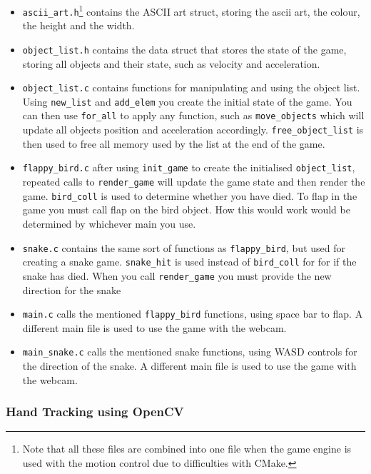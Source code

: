 \documentclass[10pt]{article}
\begin{document}
\begin{itemize}
\item \texttt{ascii\_art.h}\footnote{Note that all these files are combined into one file when the game engine is used with the motion control due to difficulties with CMake.} contains the ASCII art struct, storing the ascii art, the colour, the height and the width.
\item \texttt{object\_list.h} contains the data struct that stores the state of the game, storing all objects and their state, such as velocity and acceleration.
\item \texttt{object\_list.c} contains functions for manipulating and using the object list. Using \texttt{new\_list} and \texttt{add\_elem} you create the initial state of the game. You can then use \texttt{for\_all} to apply any function, such as \texttt{move\_objects} which will update all objects position and acceleration accordingly. \texttt{free\_object\_list} is then used to free all memory used by the list at the end of the game.
\item \texttt{flappy\_bird.c} after using \texttt{init\_game} to create the initialised \texttt{object\_list}, repeated calls to \texttt{render\_game} will update the game state and then render the game. \texttt{bird\_coll} is used to determine whether you have died. To flap in the game you must call flap on the bird object. How this would work would be determined by whichever main you use.
\item \texttt{snake.c} contains the same sort of functions as \texttt{flappy\_bird}, but used for creating a snake game. \texttt{snake\_hit} is used instead of \texttt{bird\_coll} for for if the snake has died. When you call \texttt{render\_game} you must provide the new direction for the snake 
\item \texttt{main.c} calls the mentioned \texttt{flappy\_bird} functions, using space bar to flap. A different main file is used to use the game with the webcam.
\item \texttt{main\_snake.c} calls the mentioned snake functions, using WASD controls for the direction of the snake. A different main file is used to use the game with the webcam.
\end{itemize}

\subsubsection{Hand Tracking using OpenCV}
\end{document}
